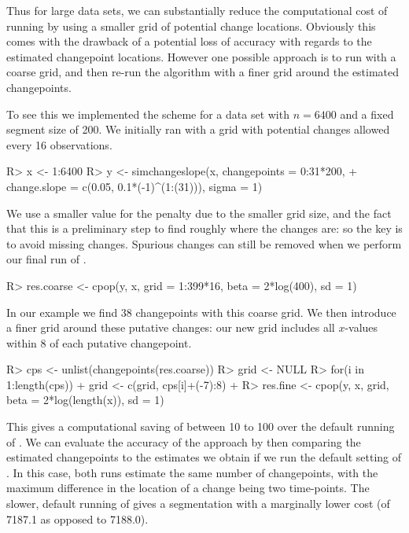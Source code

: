 \documentclass[article]{jss}
\begin{document}
Thus for large data sets, we can substantially reduce the computational cost of running  by using a smaller grid of potential change locations. Obviously this comes with the drawback of a potential loss of accuracy with regards to the estimated changepoint locations. However one possible approach is to run  with a coarse grid, and then re-run the algorithm with a finer grid around the estimated changepoints.

To see this we implemented the scheme for a data set with $n=6400$ and a fixed segment size of 200.  We initially ran  with a grid with potential changes allowed every 16 observations.
\begin{CodeChunk}
\begin{CodeInput}
R> x <- 1:6400
R> y <- simchangeslope(x, changepoints = 0:31*200, 
+ change.slope = c(0.05, 0.1*(-1)^(1:(31))), sigma = 1)
\end{CodeInput}
\end{CodeChunk}

We use a smaller value for the penalty due to the smaller grid size, and the fact that this is a preliminary step to find roughly where the changes are: so the key is to avoid missing changes. Spurious changes can still be removed when we perform our final run of . 
\begin{CodeChunk}
\begin{CodeInput}
R> res.coarse <- cpop(y, x, grid = 1:399*16, beta = 2*log(400), sd = 1)
\end{CodeInput}
\end{CodeChunk}

In our example we find 38 changepoints with this coarse grid. We then introduce a finer grid around these putative changes: our new grid includes all $x$-values within 8 of each putative changepoint.
\begin{CodeChunk}
\begin{CodeInput}
R> cps <- unlist(changepoints(res.coarse))
R> grid <- NULL
R> for(i in 1:length(cps)) {
+   grid <- c(grid, cps[i]+(-7):8)
+ }
R> res.fine <- cpop(y, x, grid, beta = 2*log(length(x)), sd = 1)
\end{CodeInput}
\end{CodeChunk}

This gives a computational saving of between 10 to 100 over the default running of . We can evaluate the accuracy of the approach by then comparing the estimated changepoints to the estimates we obtain if we run the default setting of . In this case, both runs estimate the same number of changepoints, with the maximum difference in the location of a change being two time-points. The slower, default running of  gives a segmentation with a marginally lower cost (of 7187.1 as opposed to 7188.0).
\end{document}

